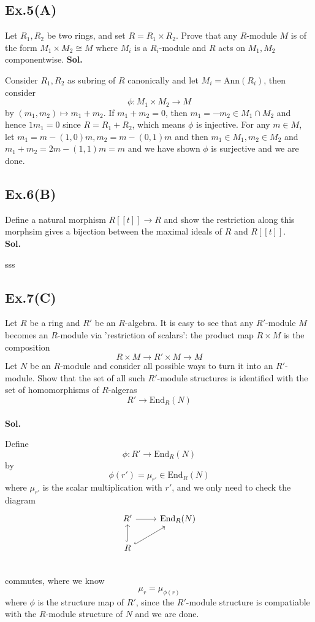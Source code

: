\documentclass[lang=en,11pt,a4paper,citestyle =authoryear]{elegantpaper}
\begin{document}
\subsection*{Ex.5(A)} 
Let $R_1,R_2$ be two rings, and set $R = R_1\times R_2$. Prove that any $R$-module $M$ is of the form $M_1\times M_2 \cong M$ where $M_i$ is a $R_i$-module and $R$ acts on $M_1,M_2$ componentwise.
\vspace{0.5em}
\textbf{Sol.} \par
Consider $R_1,R_2$ as subring of $R$ canonically and let $M_i = \text{Ann}(R_i)$, then consider
\[
\phi:M_1\times M_2 \to M
\]
by $(m_1,m_2)\mapsto m_1+m_2$. If $m_1+m_2 = 0$, then $m_1 = -m_2 \in M_1\cap M_2$ and hence $1m_1 = 0$ since $R = R_1+R_2$, which means $\phi$ is injective. For any $m\in M$, let $m_1 = m - (1,0)m, m_2 = m-(0,1)m$ and then $m_1\in M_1,m_2\in M_2$ and $m_1+m_2 = 2m - (1,1) m = m$ and we have shown $\phi$ is surjective and we are done.
\par 
\vspace{0.5em}

\subsection*{Ex.6(B)} 
    Define a natural morphism $R[[t]] \to R$ and show the restriction along this morphsim gives a bijection between the maximal ideals of $R$ and $R[[t]]$.
\vspace{0.5em}\\
\textbf{Sol.} \par
    sss
\vspace{0.5em}

\subsection*{Ex.7(C)} 
Let $R$ be a ring and $R'$ be an $R$-algebra. It is easy to see that any $R'$-module $M$ becomes an $R$-module via 'restriction of scalars': the product map $R\times M$ is the composition
\[R\times M \to R'\times M \to M\]
Let $N$ be an $R$-module and consider all possible ways to turn it into an $R'$-module. Show that the set of all such $R'$-module structures is identified with the set of homomorphisms of $R$-algeras
\[R' \to \text{End}_R(N)\]
\vspace{0.5em}\\
\textbf{Sol.} \par
    Define
    \[
    \phi:R' \to \text{End}_R(N)
    \]
    by
    \[
    \phi(r') = \mu_{r'} \in \text{End}_R(N)
    \]
    where $\mu_{r'}$ is the scalar multiplication with $r'$, and we only need to check the diagram
    \[
    \begin{tikzcd}
        R'\arrow[r] & \text{End}_R(N) \\
        R\arrow[hookrightarrow]{u}\arrow[hookrightarrow]{ru} & \\
    \end{tikzcd}
    \]
    commutes, where we know
    \[
    \mu_r = \mu_{\phi(r)}
    \]
    where $\phi$ is the structure map of $R'$, since the $R'$-module structure is compatiable with the $R$-module structure of $N$ and we are done.
\vspace{0.5em}


\addappheadtotoc
\end{document}
